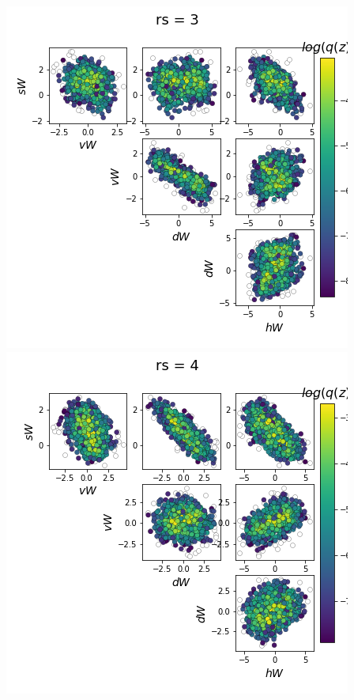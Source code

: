 \documentclass[11pt]{article}
\begin{document}
\begin{center}
\includegraphics[scale=0.33]{figs/Z_SC_pvar_reduced_c=0_p=80_rs=3.png} \\
\includegraphics[scale=0.33]{figs/Z_SC_pvar_reduced_c=0_p=80_rs=4.png}

\end{center}
\end{document}
